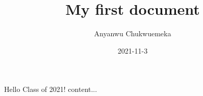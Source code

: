 \documentclass{article}
\title{My first document}
\date{2021-11-3}
\author{Anyanwu Chukwuemeka}
\begin{document}
	\maketitle
	\newpage
	Hello Class of 2021!	content...
\end{document}
